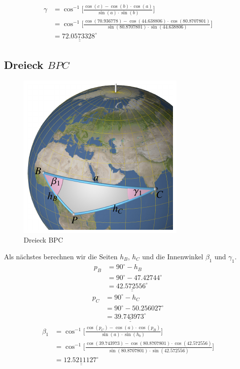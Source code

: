 	\begin{align}
	\gamma &=  \cos^{-1}  \bigg[\frac{\cos(c)-\cos(b) \cdot \cos(a)}{\sin(a) \cdot \sin(b)}\bigg] \nonumber \\
	&=  \cos^{-1}  \bigg[\frac{\cos(70.936778)-\cos(44.638806) \cdot \cos(80.8707801)}{\sin(80.8707801) \cdot \sin(44.638806)}\bigg] \nonumber \\
	&=\underline{\underline{72.0573328^\circ}} \nonumber
\end{align}
\subsection{Dreieck $BPC$}
\begin{figure}
	\includegraphics{papers/nav/bilder/position3.pdf}
	\caption{Dreieck BPC}
\end{figure}
Als nächstes berechnen wir die Seiten $h_B$, $h_C$ und die Innenwinkel $\beta_1$ und $\gamma_1$.
\begin{align}
	p_B&=90^\circ - h_B \nonumber \\
	&= 90^\circ - 47.42744^\circ \nonumber \\
	&= \underline{\underline{42.572556^\circ}} \nonumber
\end{align}
\begin{align}
	p_C &= 90^\circ - h_C \nonumber \\
	&= 90^\circ - 50.256027^\circ \nonumber \\
	&= \underline{\underline{39.743973^\circ}} \nonumber
\end{align}
\begin{align}
	\beta_1 &= \cos^{-1}  \bigg[\frac{\cos(p_C)-\cos(a) \cdot \cos(p_B)}{\sin(a) \cdot \sin(h_b)}\bigg] \nonumber \\
	&= \cos^{-1}  \bigg[\frac{\cos(39.743973)-\cos(80.8707801) \cdot \cos(42.572556)}{\sin(80.8707801) \cdot \sin(42.572556)}\bigg] \nonumber \\
	&=\underline{\underline{12.5211127^\circ}} \nonumber
\end{align}
